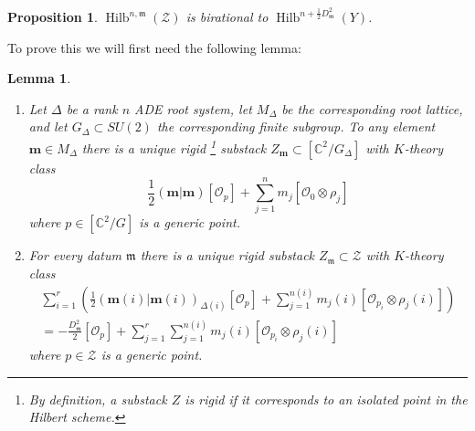 \documentclass{amsart}
\newtheorem{proposition}[theorem]{Proposition}
\newtheorem{lemma}[theorem]{Lemma}
\theoremstyle{definition}
\newcommand{\half}{\frac{1}{2}}
\newcommand{\mdata}{\mathfrak{m}}
\renewcommand{\O}{\mathcal{O}}
\newcommand{\Zcal}{\mathcal{Z}}
\newcommand{\mvec}{\bm{m}}
\newcommand{\Hilb}{\operatorname{Hilb}}
\begin{document}
\begin{proposition}\label{prop: Hilb(Z) is birational to Hilb(Y)}
	$\Hilb^{n,\mdata}(\Zcal)$ is birational to $\Hilb^{n+\half
		D_{\mdata}^{2}}(Y)$. 
\end{proposition}

To prove this we will first need the following lemma:

\begin{lemma}
\label{lem:rigidsh} $\quad$

	\begin{enumerate} \item Let $\Delta$ be a rank $n$ ADE root
system, let $M_{\Delta }$ be the corresponding root lattice, and let
$G_{\Delta } \subset SU(2)$ the corresponding finite subgroup. To any
element $\mvec \in M_{\Delta }$ there is a unique rigid
\footnote{By
definition, a substack $Z$ is \emph{rigid} if it corresponds to an
isolated point in the Hilbert scheme. }
substack $Z_{\mvec}\subset [\mathbb{C}^2/G_{\Delta}]$ with $K$-theory
class
\[
\half (\mvec|\mvec)[\O_{p}] + \sum_{j=1}^{n}
m_{j}[\O_{0}\otimes \rho_{j}]
\]
where $p \in [\mathbb{C}^2/G]$ is a generic point.
	
		\item For every datum $\mdata$ there is a unique rigid
substack $Z_{\mdata} \subset \mathcal{Z}$ with $K$-theory
class \begin{gather*}\sum_{i=1}^r
\left(
\frac{1}{2}(\mvec(i)|\mvec(i))_{\Delta (i)}[\O_{p}] + \sum_{j=1}^{n(i)}
m_{j}(i)[\O_{p_i}\otimes \rho_{j}(i)]
 \right)\\
=-\frac{
D_{\mdata}^{2}}{2}[\O_{p}] +\sum_{j=1}^{r} \sum_{j=1}^{n(i)} m_{j}(i)[\O_{p_i}\otimes
\rho_{j}(i)] \end{gather*} where $p \in \Zcal$ is a generic point.
	\end{enumerate}
\end{lemma}
\end{document}
